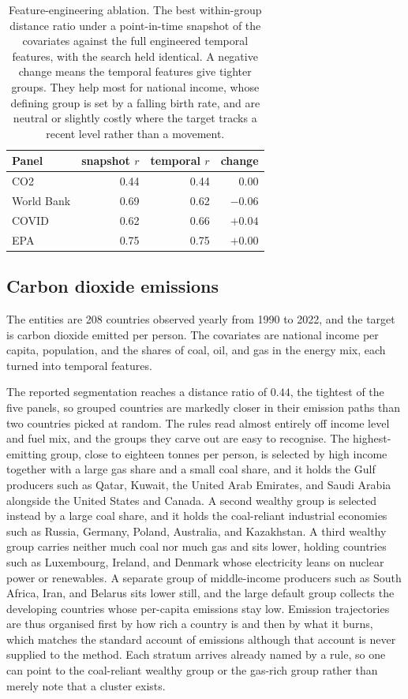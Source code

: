 \begin{table}[t]
\centering
\small
\begin{tabular}{@{}l r r r@{}}
\toprule
Panel & snapshot $r$ & temporal $r$ & change \\
\midrule
CO2        & 0.44 & 0.44 & $0.00$ \\
World Bank & 0.69 & 0.62 & $-0.06$ \\
COVID      & 0.62 & 0.66 & $+0.04$ \\
EPA        & 0.75 & 0.75 & $+0.00$ \\
\bottomrule
\end{tabular}
\caption{Feature-engineering ablation. The best within-group distance ratio under a point-in-time snapshot of the covariates against the full engineered temporal features, with the search held identical. A negative change means the temporal features give tighter groups. They help most for national income, whose defining group is set by a falling birth rate, and are neutral or slightly costly where the target tracks a recent level rather than a movement.}
\label{tab:ablation}
\end{table}

\subsection{Carbon dioxide emissions}
\label{sec:co2}

The entities are 208 countries observed yearly from 1990 to 2022, and the target is carbon dioxide emitted per person. The covariates are national income per capita, population, and the shares of coal, oil, and gas in the energy mix, each turned into temporal features.

The reported segmentation reaches a distance ratio of $0.44$, the tightest of the five panels, so grouped countries are markedly closer in their emission paths than two countries picked at random. The rules read almost entirely off income level and fuel mix, and the groups they carve out are easy to recognise. The highest-emitting group, close to eighteen tonnes per person, is selected by high income together with a large gas share and a small coal share, and it holds the Gulf producers such as Qatar, Kuwait, the United Arab Emirates, and Saudi Arabia alongside the United States and Canada. A second wealthy group is selected instead by a large coal share, and it holds the coal-reliant industrial economies such as Russia, Germany, Poland, Australia, and Kazakhstan. A third wealthy group carries neither much coal nor much gas and sits lower, holding countries such as Luxembourg, Ireland, and Denmark whose electricity leans on nuclear power or renewables. A separate group of middle-income producers such as South Africa, Iran, and Belarus sits lower still, and the large default group collects the developing countries whose per-capita emissions stay low. Emission trajectories are thus organised first by how rich a country is and then by what it burns, which matches the standard account of emissions although that account is never supplied to the method. Each stratum arrives already named by a rule, so one can point to the coal-reliant wealthy group or the gas-rich group rather than merely note that a cluster exists.

